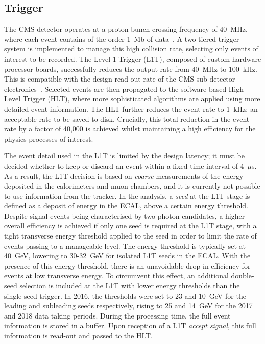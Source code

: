 
\subsection{Trigger}\label{sec:trigger}
The CMS detector operates at a proton bunch crossing frequency of 40~MHz, where each event contains of the order 1~Mb of data~\cite{Khachatryan:2016bia}. A two-tiered trigger system is implemented to manage this high collision rate, selecting only events of interest to be recorded. The Level-1 Trigger (L1T), composed of custom hardware processor boards, successfully reduces the output rate from 40~MHz to 100~kHz. This is compatible with the design read-out rate of the CMS sub-detector electronics~\cite{Sphicas:2002gg}. Selected events are then propagated to the software-based High-Level Trigger (HLT), where more sophisticated algorithms are applied using more detailed event information. The HLT further reduces the event rate to 1~kHz; an acceptable rate to be saved to disk. Crucially, this total reduction in the event rate by a factor of 40,000 is achieved whilst maintaining a high efficiency for the physics processes of interest.

The event detail used in the L1T is limited by the design latency; it must be decided whether to keep or discard an event within a fixed time interval of 4~$\mu$s. As a result, the L1T decision is based on \textit{coarse} measurements of the energy deposited in the calorimeters and muon chambers, and it is currently not possible to use information from the tracker. 
In the \Hgg analysis, a \textit{seed} at the L1T stage is defined as a deposit of energy in the ECAL, above a certain energy threshold. Despite signal events being characterised by two photon candidates, a higher overall efficiency is achieved if only one seed is required at the L1T stage, with a tight transverse energy threshold applied to the seed in order to limit the rate of events passing to a manageable level. The energy threshold is typically set at 40~GeV, lowering to 30-32~GeV for isolated L1T seeds in the ECAL. With the presence of this energy threshold, there is an unavoidable drop in efficiency for \Hgg events at low transverse energy. To circumvent this effect, an additional double-seed selection is included at the L1T with lower energy thresholds than the single-seed trigger. In 2016, the thresholds were set to 23 and 10~GeV for the leading and subleading seeds respectively, rising to 25 and 14~GeV for the 2017 and 2018 data taking periods.
During the processing time, the full event information is stored in a buffer. Upon reception of a L1T \textit{accept signal}, this full information is read-out and passed to the HLT.

